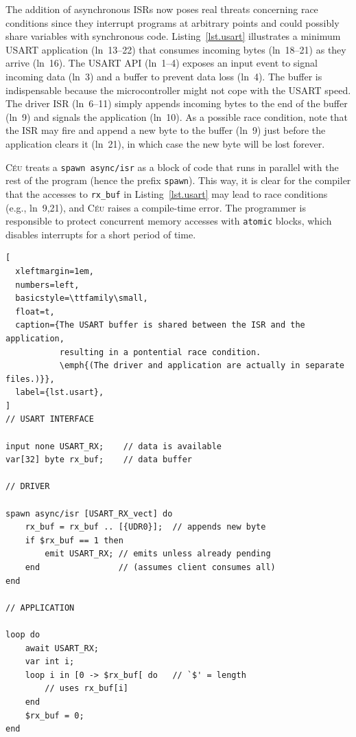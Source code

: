 \documentclass[sigplan,10pt,review,anonymous]{acmart}\settopmatter{printfolios=true,printccs=false,printacmref=false}
\newcommand{\CEU}{\textsc{C\'{e}u}\xspace}
\newcommand{\code}[1] {{\small{\texttt{#1}}}}
\begin{document}
The addition of asynchronous ISRs now poses real threats concerning race
conditions since they interrupt programs at arbitrary points and could possibly
share variables with synchronous code.
%
Listing~\ref{lst.usart} illustrates a minimum USART application (ln~13--22)
that consumes incoming bytes (ln~18--21) as they arrive (ln~16).
%
The USART API (ln~1--4) exposes an input event to signal incoming data (ln~3)
and a buffer to prevent data loss (ln~4).
The buffer is indispensable because the microcontroller might not cope with the USART 
speed.
%
The driver ISR (ln~6--11) simply appends incoming bytes to the end of the
buffer (ln~9) and signals the application (ln~10).
%
As a possible race condition, note that the ISR may fire and append a new byte
to the buffer (ln~9) just before the application clears it (ln~21), in which
case the new byte will be lost forever.

\CEU treats a \code{spawn~async/isr} as a block of code that runs in parallel with
the rest of the program (hence the prefix \code{spawn}).
%
This way, it is clear for the compiler that the accesses to \code{rx\_buf} in
Listing~\ref{lst.usart} may lead to race conditions (e.g., ln~9,21), and \CEU
raises a compile-time error.
%
The programmer is responsible to protect concurrent memory accesses with
\code{atomic} blocks, which disables interrupts for a short period
of time.

\begin{lstlisting}[
  xleftmargin=1em,
  numbers=left,
  basicstyle=\ttfamily\small,
  float=t,
  caption={The USART buffer is shared between the ISR and the application,
           resulting in a pontential race condition.
           \emph{(The driver and application are actually in separate files.)}},
  label={lst.usart},
]
// USART INTERFACE

input none USART_RX;    // data is available
var[32] byte rx_buf;    // data buffer

// DRIVER

spawn async/isr [USART_RX_vect] do
    rx_buf = rx_buf .. [{UDR0}];  // appends new byte
    if $rx_buf == 1 then
        emit USART_RX; // emits unless already pending
    end                // (assumes client consumes all)
end

// APPLICATION

loop do
    await USART_RX;
    var int i;
    loop i in [0 -> $rx_buf[ do   // `$' = length
        // uses rx_buf[i]
    end
    $rx_buf = 0;
end
\end{lstlisting}
\end{document}
